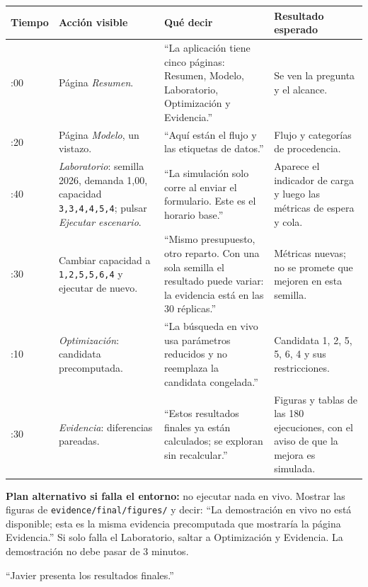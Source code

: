 \documentclass[11pt,a4paper]{article}
\newcommand{\transicion}[1]{\par\noindent{\color{main}\textbf{Transición:}} #1}
\begin{document}
\begin{longtable}{@{}>{\raggedright\arraybackslash}p{1.5cm}>{\raggedright\arraybackslash}p{4.6cm}>{\raggedright\arraybackslash}p{4.2cm}>{\raggedright\arraybackslash}p{5cm}@{}}
\toprule
Tiempo & Acción visible & Qué decir & Resultado esperado\\
\midrule\endhead
7:00 & Página \emph{Resumen}. & ``La aplicación tiene cinco páginas: Resumen, Modelo, Laboratorio, Optimización y Evidencia.'' & Se ven la pregunta y el alcance.\\
7:20 & Página \emph{Modelo}, un vistazo. & ``Aquí están el flujo y las etiquetas de datos.'' & Flujo y categorías de procedencia.\\
7:40 & \emph{Laboratorio}: semilla 2026, demanda 1,00, capacidad \texttt{3,3,4,4,5,4}; pulsar \emph{Ejecutar escenario}. & ``La simulación solo corre al enviar el formulario. Este es el horario base.'' & Aparece el indicador de carga y luego las métricas de espera y cola.\\
8:30 & Cambiar capacidad a \texttt{1,2,5,5,6,4} y ejecutar de nuevo. & ``Mismo presupuesto, otro reparto. Con una sola semilla el resultado puede variar: la evidencia está en las 30 réplicas.'' & Métricas nuevas; no se promete que mejoren en esta semilla.\\
9:10 & \emph{Optimización}: candidata precomputada. & ``La búsqueda en vivo usa parámetros reducidos y no reemplaza la candidata congelada.'' & Candidata 1, 2, 5, 5, 6, 4 y sus restricciones.\\
9:30 & \emph{Evidencia}: diferencias pareadas. & ``Estos resultados finales ya están calculados; se exploran sin recalcular.'' & Figuras y tablas de las 180 ejecuciones, con el aviso de que la mejora es simulada.\\
\bottomrule
\end{longtable}

\textbf{Plan alternativo si falla el entorno:} no ejecutar nada en vivo. Mostrar las figuras de \texttt{evidence/final/figures/} y decir: ``La demostración en vivo no está disponible; esta es la misma evidencia precomputada que mostraría la página Evidencia.'' Si solo falla el Laboratorio, saltar a Optimización y Evidencia. La demostración no debe pasar de 3 minutos.
\transicion{``Javier presenta los resultados finales.''}
\end{document}
